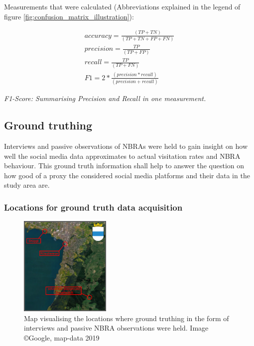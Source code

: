 Measurements that were calculated (Abbreviations explained in the legend of figure \ref{fig:confusion_matrix_illustration}):

\begin{gather*}
accuracy = \frac{(TP+TN)}{(TP+TN+FP+FN)}\\
precision = \frac{TP}{(TP+FP)}\\
recall = \frac{TP}{(TP+FN)}\\
F1 = 2*\frac{(precision*recall)}{(precision+recall)}
\end{gather*}

\textit{F1-Score: Summarising Precision and Recall in one measurement.}

\subsection{Ground truthing} \label{groud_truthing}
Interviews and passive observations of NBRAs were held to gain insight on how well the social media data approximates to actual visitation rates and NBRA behaviour. This ground truth information shall help to answer the question on how good of a proxy the considered social media platforms and their data in the study area are.
\subsubsection{Locations for ground truth data acquisition} \label{locations_ground_truthing_data}

\begin{figure} %
    \centerline{\includegraphics[trim={0 0 0 0},clip,width=0.39\textwidth]{img/interviews_locations}}
  \caption{Map visualising the locations where ground truthing in the form of interviews and passive NBRA observations were held. Image \copyright Google, map-data 2019}
  \label{fig:locations_ground_truthing}
\end{figure}

